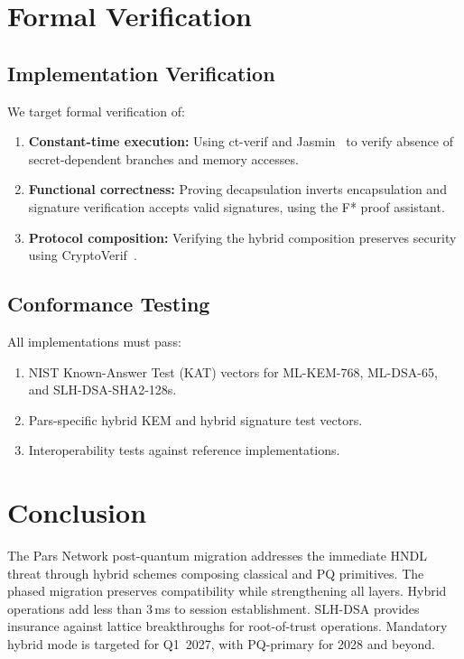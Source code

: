 \documentclass[11pt,a4paper]{article}
\begin{document}
\section{Formal Verification}
\label{sec:formal}

\subsection{Implementation Verification}

We target formal verification of:

\begin{enumerate}
    \item \textbf{Constant-time execution:} Using ct-verif and
    Jasmin~\cite{almeida2017jasmin} to verify absence of secret-dependent
    branches and memory accesses.
    \item \textbf{Functional correctness:} Proving decapsulation inverts
    encapsulation and signature verification accepts valid signatures,
    using the F* proof assistant.
    \item \textbf{Protocol composition:} Verifying the hybrid composition
    preserves security using CryptoVerif~\cite{blanchet2008cryptoverif}.
\end{enumerate}

\subsection{Conformance Testing}

All implementations must pass:

\begin{enumerate}
    \item NIST Known-Answer Test (KAT) vectors for ML-KEM-768, ML-DSA-65,
    and SLH-DSA-SHA2-128s.
    \item Pars-specific hybrid KEM and hybrid signature test vectors.
    \item Interoperability tests against reference implementations.
\end{enumerate}

\section{Conclusion}
\label{sec:conclusion}

The Pars Network post-quantum migration addresses the immediate HNDL
threat through hybrid schemes composing classical and PQ primitives.
The phased migration preserves compatibility while strengthening all
layers.  Hybrid operations add less than 3\,ms to session establishment.
SLH-DSA provides insurance against lattice breakthroughs for root-of-trust
operations.  Mandatory hybrid mode is targeted for Q1~2027, with
PQ-primary for 2028 and beyond.
\end{document}
